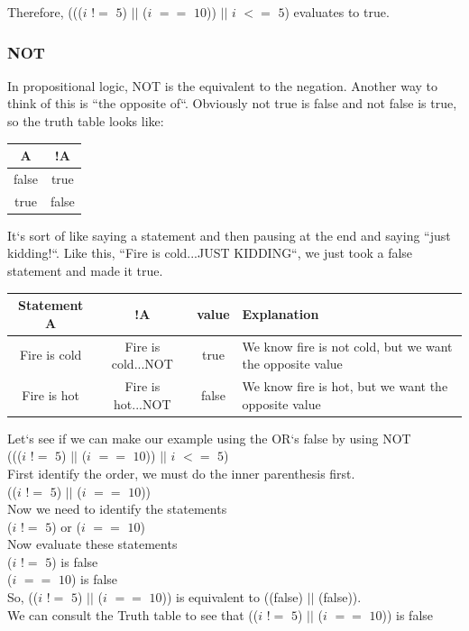 \documentclass[11]{article}
\begin{document}
 Therefore, ((($i$ $!=$ $5$) $||$ ($i$ $==$ $10$)) $||$ $i$ $<=$ $5$) evaluates to true.
 
 \subsubsection{NOT}
 In propositional logic, NOT is the equivalent to the negation. Another way to think of this is ``the opposite of``. Obviously not true is false and not false is true, so the truth table looks like:\\
 
  \begin{center}
  \begin{tabular}{ | c | c |}
    \hline
    A & !A  \\ \hline
    false & true\\ \hline
    true & false\\ 
    \hline
  \end{tabular}
\end{center}

It`s sort of like saying a statement and then pausing at the end and saying ``just kidding!``. Like this, ``Fire is cold...JUST KIDDING``, we just took a false statement and made it true.

\begin{center}
  \begin{tabular}{ | c | c | c | p{4.5cm} |}
    \hline
		Statement A  & !A & value & Explanation \\ \hline
		Fire is cold & Fire is cold...NOT & true & We know fire is not cold, but we want the opposite value\\  \hline
		
		Fire is hot & Fire is hot...NOT & false & We know fire is hot, but we want the opposite value\\ \hline		
  \end{tabular}
\end{center}

Let`s see if we can make our example using the OR`s false by using NOT\\
((($i$ $!=$ $5$) $||$ ($i$ $==$ $10$)) $||$ $i$ $<=$ $5$)\\

First identify the order, we must do the inner parenthesis first.\\
(($i$ $!=$ $5$) $||$ ($i$ $==$ $10$))\\
Now we need to identify the statements\\
($i$ $!=$ $5$) or ($i$ $==$ $10$) \\
Now evaluate these statements \\
($i$ $!=$ $5$) is false\\
 ($i$ $==$ $10$) is false \\
 So, (($i$ $!=$ $5$) $||$ ($i$ $==$ $10$)) is equivalent to ((false) $||$ (false)).\\
 We can consult the Truth table to see that (($i$ $!=$ $5$) $||$ ($i$ $==$ $10$)) is false\\
 
\end{document}
